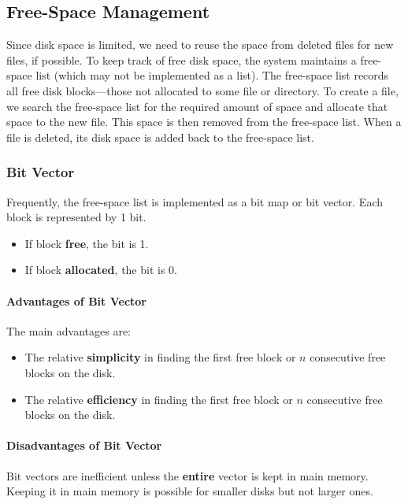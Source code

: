 \subsection{Free-Space Management}\label{subsec:Free_Space_Management}
Since disk space is limited, we need to reuse the space from deleted files for new files, if possible.
To keep track of free disk space, the system maintains a free-space list (which may not be implemented as a list).
The free-space list records all free disk blocks—those not allocated to some file or directory.
To create a file, we search the free-space list for the required amount of space and allocate that space to the new file.
This space is then removed from the free-space list.
When a file is deleted, its disk space is added back to the free-space list.

\subsubsection{Bit Vector}\label{subsubsec:Free_Space_Bit_Vector}
Frequently, the free-space list is implemented as a bit map or bit vector.
Each block is represented by 1 bit.
\begin{itemize}[noitemsep]
\item If block \textbf{free}, the bit is 1.
\item If block \textbf{allocated}, the bit is 0.
\end{itemize}

\paragraph{Advantages of Bit Vector}\label{par:Free_Space_Bit_Vector_Advantages}
The main advantages are:
\begin{itemize}[noitemsep]
\item The relative \textbf{simplicity} in finding the first free block or $n$ consecutive free blocks on the disk.
\item The relative \textbf{efficiency} in finding the first free block or $n$ consecutive free blocks on the disk.
\end{itemize}

\paragraph{Disadvantages of Bit Vector}\label{par:Free_Space_Bit_Vector_Disadvantages}
Bit vectors are inefficient unless the \textbf{entire} vector is kept in main memory.
Keeping it in main memory is possible for smaller disks but not larger ones.

